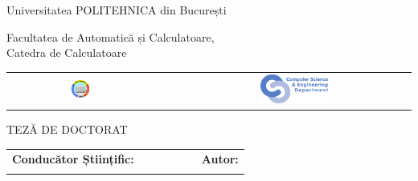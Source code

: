 \begin{titlepage}
	\begin{center}
		{\Large Universitatea POLITEHNICA din București}
		\par\vspace*{2mm}
		{\Large Facultatea de Automatică și Calculatoare,\\
		 Catedra de Calculatoare}
		\par\vspace*{3mm}
		\begin{table}[h]
        	\begin{center}
				\begin{tabular}{cccc}
                    \includegraphics[width=0.13\textwidth]{src/img/branding/upb}
					& & &
					\includegraphics[width=0.30\textwidth]{src/img/branding/cs}
            	\end{tabular}
			\end{center}
		\end{table}
		
		\par\vspace*{35mm}
		{\Huge TEZĂ DE DOCTORAT}
		\par\vspace*{15mm}
		{\Huge \VARtitlero }
		\par\vspace*{35mm}
		\begin{table}[h]
        	\begin{center}
				\begin{tabular}{lcccccl}
					\Large \textbf{\Large Conducător Științific:}
					\vspace*{1mm} &&&&&& \Large \textbf{\Large Autor:}\vspace*{1mm} \\
					\Large \VARadviser &&&&&& \Large \VARauthor
				\end{tabular}
			\end{center}
		\end{table}

		\par\vspace*{40mm}
		\Large \VARtitlefooterro
	\end{center}
\end{titlepage}
